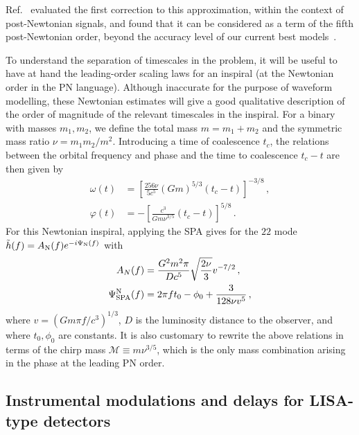 \documentclass[aps,showpacs,%
prd,superscriptaddress,nofootinbib]{revtex4}
\newcommand\calM{{\mathcal{M}}}
\begin{document}
Ref.~\cite{Droz+99} evaluated the first correction to this approximation, within the context of post-Newtonian signals, and found that it can be considered as a term of the fifth post-Newtonian order, beyond the accuracy level of our current best models~\cite{BlanchetLiving}.

To understand the separation of timescales in the problem, it will be useful to have at hand the leading-order scaling laws for an inspiral (at the Newtonian order in the PN language). Although inaccurate for the purpose of waveform modelling, these Newtonian estimates will give a good qualitative description of the order of magnitude of the relevant timescales in the inspiral. For a binary with masses $m_{1}, m_{2}$, we define the total mass $m=m_{1}+m_{2}$ and the symmetric mass ratio $\nu = m_{1}m_{2}/m^{2}$. Introducing a time of coalescence $t_{c}$, the relations between the orbital frequency and phase and the time to coalescence $t_{c} - t$ are then given by
\begin{subequations}
\begin{align}
	\omega(t) &= \left[ \frac{256\nu}{5c^{5}} (Gm)^{5/3} (t_{c}-t) \right]^{-3/8} \,, \\
	\varphi(t) &= -\left[ \frac{c^{3}}{G m \nu^{3/5}} (t_{c}-t) \right]^{5/8} \,.
\end{align}
\end{subequations}
For this Newtonian inspiral, applying the SPA gives for the $22$ mode $\tilde{h}(f) = A_{\rm N}(f)e^{-i\Psi_{\rm N}(f)}$ with
\begin{subequations}
\begin{align}
	A_{N}(f) &= \frac{G^{2}m^{2} \pi}{Dc^{5}} \sqrt{\frac{2\nu}{3}} v^{-7/2}\,,\\
	\Psi_{\rm SPA}^{\rm N}(f) &= 2\pi f t_{0} - \phi_{0} + \frac{3}{128\nu v^{5}} \,, 
\end{align}
\end{subequations}
where $v=(G m \pi f/c^{3})^{1/3}$, $D$ is the luminosity distance to the observer, and where $t_{0}, \phi_{0}$ are constants. It is also customary to rewrite the above relations in terms of the chirp mass $\calM \equiv m\nu^{3/5}$, which is the only mass combination arising in the phase at the leading PN order.


\subsection{Instrumental modulations and delays for LISA-type detectors}
\label{subsec:modulationLISA}
\end{document}
